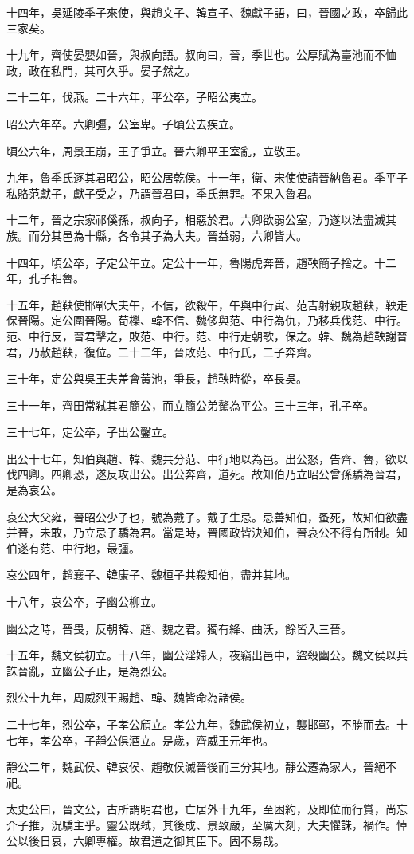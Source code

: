 十四年，吳延陵季子來使，與趙文子、韓宣子、魏獻子語，曰，晉國之政，卒歸此三家矣。

十九年，齊使晏嬰如晉，與叔向語。叔向曰，晉，季世也。公厚賦為臺池而不恤政，政在私門，其可久乎。晏子然之。

二十二年，伐燕。二十六年，平公卒，子昭公夷立。

昭公六年卒。六卿彊，公室卑。子頃公去疾立。

頃公六年，周景王崩，王子爭立。晉六卿平王室亂，立敬王。

九年，魯季氏逐其君昭公，昭公居乾侯。十一年，衛、宋使使請晉納魯君。季平子私賂范獻子，獻子受之，乃謂晉君曰，季氏無罪。不果入魯君。

十二年，晉之宗家祁傒孫，叔向子，相惡於君。六卿欲弱公室，乃遂以法盡滅其族。而分其邑為十縣，各令其子為大夫。晉益弱，六卿皆大。

十四年，頃公卒，子定公午立。定公十一年，魯陽虎奔晉，趙鞅簡子捨之。十二年，孔子相魯。

十五年，趙鞅使邯鄲大夫午，不信，欲殺午，午與中行寅、范吉射親攻趙鞅，鞅走保晉陽。定公圍晉陽。荀櫟、韓不信、魏侈與范、中行為仇，乃移兵伐范、中行。范、中行反，晉君擊之，敗范、中行。范、中行走朝歌，保之。韓、魏為趙鞅謝晉君，乃赦趙鞅，復位。二十二年，晉敗范、中行氏，二子奔齊。

三十年，定公與吳王夫差會黃池，爭長，趙鞅時從，卒長吳。

三十一年，齊田常弒其君簡公，而立簡公弟驁為平公。三十三年，孔子卒。

三十七年，定公卒，子出公鑿立。

出公十七年，知伯與趙、韓、魏共分范、中行地以為邑。出公怒，告齊、魯，欲以伐四卿。四卿恐，遂反攻出公。出公奔齊，道死。故知伯乃立昭公曾孫驕為晉君，是為哀公。

哀公大父雍，晉昭公少子也，號為戴子。戴子生忌。忌善知伯，蚤死，故知伯欲盡并晉，未敢，乃立忌子驕為君。當是時，晉國政皆決知伯，晉哀公不得有所制。知伯遂有范、中行地，最彊。

哀公四年，趙襄子、韓康子、魏桓子共殺知伯，盡并其地。

十八年，哀公卒，子幽公柳立。

幽公之時，晉畏，反朝韓、趙、魏之君。獨有絳、曲沃，餘皆入三晉。

十五年，魏文侯初立。十八年，幽公淫婦人，夜竊出邑中，盜殺幽公。魏文侯以兵誅晉亂，立幽公子止，是為烈公。

烈公十九年，周威烈王賜趙、韓、魏皆命為諸侯。

二十七年，烈公卒，子孝公頎立。孝公九年，魏武侯初立，襲邯鄲，不勝而去。十七年，孝公卒，子靜公俱酒立。是歲，齊威王元年也。

靜公二年，魏武侯、韓哀侯、趙敬侯滅晉後而三分其地。靜公遷為家人，晉絕不祀。

太史公曰，晉文公，古所謂明君也，亡居外十九年，至困約，及即位而行賞，尚忘介子推，況驕主乎。靈公既弒，其後成、景致嚴，至厲大刻，大夫懼誅，禍作。悼公以後日衰，六卿專權。故君道之御其臣下。固不易哉。